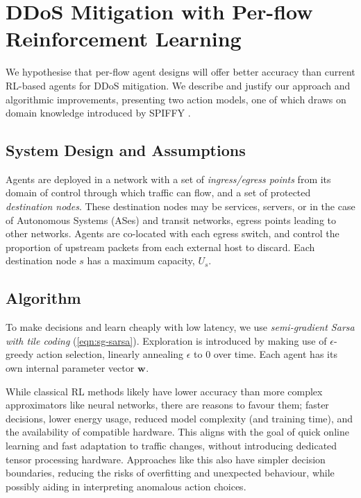 \documentclass[10pt, times, conference, letterpaper]{IEEEtran}
\newcommand{\wvec}[1]{\ensuremath{\bm{w}_{#1}}}
\begin{document}
\section{DDoS Mitigation with Per-flow Reinforcement Learning}\label{sec:ddos-mitigation-with-per-flow-reinforcement-learning}
We hypothesise that per-flow agent designs will offer better accuracy than current RL-based agents for DDoS mitigation.
We describe and justify our approach and algorithmic improvements, presenting two action models, one of which draws on domain knowledge introduced by SPIFFY \cite{DBLP:conf/ndss/KangGS16}.

\subsection{System Design and Assumptions}
Agents are deployed in a network with a set of \emph{ingress/egress points} from its domain of control through which traffic can flow, and a set of protected \emph{destination nodes}.
These destination nodes may be services, servers, or in the case of Autonomous Systems (ASes) and transit networks, egress points leading to other networks.
Agents are co-located with each egress switch, and control the proportion of upstream packets from each external host to discard.
Each destination node $s$ has a maximum capacity, $U_s$.

\subsection{Algorithm}
To make decisions and learn cheaply with low latency, we use \emph{semi-gradient Sarsa with tile coding} (\cref{eqn:sg-sarsa}).
Exploration is introduced by making use of $\epsilon$-greedy action selection, linearly annealing $\epsilon$ to 0 over time.
Each agent has its own internal parameter vector $\wvec{}$.

While classical RL methods likely have lower accuracy than more complex approximators like neural networks, there are reasons to favour them; faster decisions, lower energy usage, reduced model complexity (and training time), and the availability of compatible hardware.
This aligns with the goal of quick online learning and fast adaptation to traffic changes, without introducing dedicated tensor processing hardware.
Approaches like this also have simpler decision boundaries, reducing the risks of overfitting and unexpected behaviour, while possibly aiding in interpreting anomalous action choices.
\end{document}
